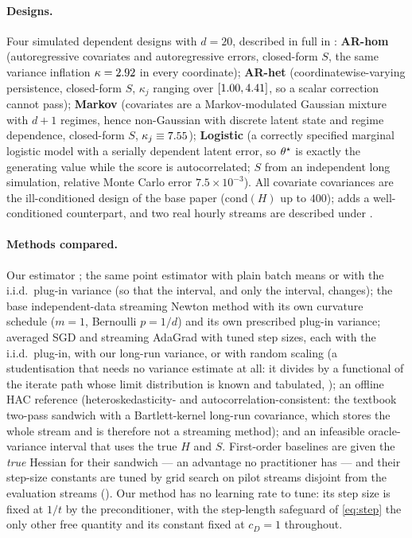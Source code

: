 \paragraph{Designs.}
Four simulated dependent designs with $d=20$, described in full in :
\textbf{AR-hom} (autoregressive covariates and autoregressive errors, closed-form $S$, the
same variance inflation $\kappa=2.92$ in every coordinate);
\textbf{AR-het} (coordinatewise-varying persistence, closed-form $S$, $\kappa_j$ ranging
over $[1.00,4.41]$, so a scalar correction cannot pass);
\textbf{Markov} (covariates are a Markov-modulated Gaussian mixture with $d+1$ regimes, hence
non-Gaussian with discrete latent state and regime dependence, closed-form $S$,
$\kappa_j\equiv7.55$);
\textbf{Logistic} (a correctly specified marginal logistic model with a serially dependent
latent error, so $\theta^\star$ is exactly the generating value while the score is autocorrelated;
$S$ from an independent long simulation, relative Monte Carlo error $7.5\times10^{-3}$).
All covariate covariances are the ill-conditioned design of the base paper
($\mathrm{cond}(H)$ up to $400$);  adds a well-conditioned counterpart, and
two real hourly streams are described under .

\paragraph{Methods compared.}
Our estimator \bgsn{}; the same point estimator with plain batch means or with the i.i.d.\
plug-in variance (so that the interval, and only the interval, changes); the base
independent-data streaming Newton method with its own curvature schedule
($m=1$, Bernoulli $p=1/d$) and its own prescribed plug-in variance; averaged SGD and
streaming AdaGrad with tuned step sizes, each with the i.i.d.\ plug-in, with our long-run
variance, or with random scaling (a studentisation that needs no variance estimate at all: it
divides by a functional of the iterate path whose limit distribution is known and tabulated,
\citealp{lee2022fast}); an offline HAC reference (heteroskedasticity- and
autocorrelation-consistent: the textbook two-pass sandwich with a Bartlett-kernel long-run
covariance, which stores the whole stream and is therefore not a streaming method); and an
infeasible oracle-variance interval that uses the true $H$ and $S$. First-order baselines are given the \emph{true} Hessian for their sandwich --- an advantage no
practitioner has --- and their step-size constants are tuned by grid search on pilot streams
disjoint from the evaluation streams (\Cref{app:hyper}). Our method has no learning rate to
tune: its step size is fixed at $1/t$ by the preconditioner, with the step-length safeguard of
\eqref{eq:step} the only other free quantity and its constant fixed at $c_D=1$ throughout.

